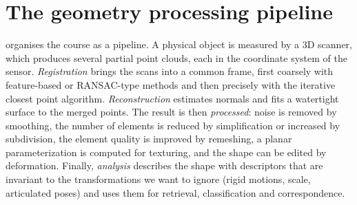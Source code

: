 \section{The geometry processing pipeline}

 organises the course as a pipeline. A physical object is measured by a 3D
scanner, which produces several partial point clouds, each in the coordinate system of the
sensor. \emph{Registration} brings the scans into a common frame, first coarsely with feature-based
or RANSAC-type methods and then precisely with the iterative closest point algorithm.
\emph{Reconstruction} estimates normals and fits a watertight surface to the merged points. The
result is then \emph{processed}: noise is removed by smoothing, the number of elements is reduced
by simplification or increased by subdivision, the element quality is improved by remeshing, a
planar parameterization is computed for texturing, and the shape can be edited by deformation.
Finally, \emph{analysis} describes the shape with descriptors that are invariant to the
transformations we want to ignore (rigid motions, scale, articulated poses) and uses them for
retrieval, classification and correspondence.

